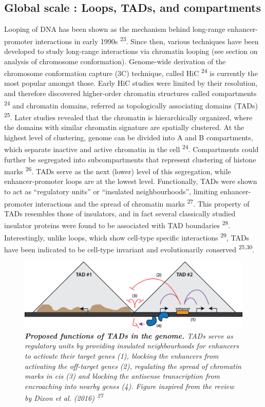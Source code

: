 \documentclass[11pt,twoside]{MPIthesis}
\theoremstyle{definition}
\theoremstyle{definition}
\theoremstyle{definition}
\theoremstyle{remark}
\begin{document}
\subsection{Global scale : Loops, TADs, and
compartments}\label{global-scale-loops-tads-and-compartments}

Looping of DNA has been shown as the mechanism behind long-range
enhancer-promoter interactions in early 1990s \textsuperscript{23}.
Since then, various techniques have been developed to study long-range
interactions via chromatin looping (see section on analysis of
chromosome conformation). Genome-wide derivation of the chromosome
conformation capture (3C) technique, called HiC \textsuperscript{24} is
currently the most popular amongst those. Early HiC studies were limited
by their resolution, and therefore discovered higher-order chromatin
structures called compartments \textsuperscript{24} and chromatin
domains, referred as topologically associating domains (TADs)
\textsuperscript{25}. Later studies revealed that the chromatin is
hierarchically organized, where the domains with similar chromatin
signature are spatially clustered. At the highest level of clustering,
genome can be divided into A and B compartments, which separate inactive
and active chromatin in the cell \textsuperscript{24}. Compartments
could further be segregated into subcompartments that represent
clustering of histone marks \textsuperscript{26}. TADs serve as the next
(lower) level of this segregation, while enhancer-promoter loops are at
the lowest level. Functionally, TADs were shown to act as ``regulatory
units'' or ``insulated neighbourhoods'', limiting enhancer-promoter
interactions and the spread of chromatin marks \textsuperscript{27}.
This property of TADs resembles those of insulators, and in fact several
classically studied insulator proteins were found to be associated with
TAD boundaries \textsuperscript{28}. Interestingly, unlike loops, which
show cell-type specific interactions \textsuperscript{29}, TADs have
been indicated to be cell-type invariant and evolutionarily conserved
\textsuperscript{25,30}.
\begin{figure}

{\centering \includegraphics[width=0.8\linewidth]{figures/intro_fig2} 

}

\caption[Proposed functions of TADs in the genome]{\emph{\textbf{Proposed functions of TADs in the genome.} TADs
serve as regulatory units by providing insulated neighbourhoods for
enhancers to activate their target genes (1), blocking the enhancers
from activating the off-target genes (2), regulating the spread of
chromatin marks in cis (3) and blocking the antisense transcription from
encroaching into nearby genes (4). Figure inspired from the review by
Dixon et al. (2016) \textsuperscript{27}}}\label{fig:unnamed-chunk-2}
\end{figure}
\end{document}
